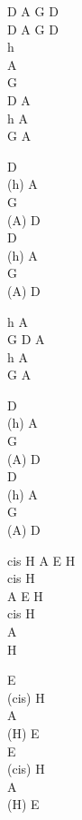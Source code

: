 \begin{chord}
D A G D\\
D A G D\\
h\\
A\\
G\\
D A\\
h A\\
G A

D\\
(h) A\\
G\\
(A) D\\
D\\
(h) A\\
G\\
(A) D

h A\\
G D A\\
h A\\
G A

D\\
(h) A\\
G\\
(A) D\\
D\\
(h) A\\
G\\
(A) D

cis H A E H\\
cis H \\
A E H\\
cis H\\
A\\
H

E\\
(cis) H\\
A\\
(H) E\\
E\\
(cis) H\\
A\\
(H) E
\end{chord}
